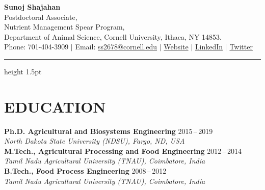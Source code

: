 \documentclass[11pt]{article}
\begin{document}
\begin{center}
\textbf{\LARGE{Sunoj Shajahan}}\\
{Postdoctoral Associate}, \\ 
Nutrient Management Spear Program, \\
Department of Animal Science, Cornell University, Ithaca, NY 14853. \\
Phone: 701-404-3909 $\vert$ Email: \url{ss2678@cornell.edu} $\vert$ \href{http://nmsp.cals.cornell.edu/about/bios/Sunoj.html}{Website} $\vert$ \href{https://www.linkedin.com/in/sunoj-shajahan-ph-d-23606190/}{LinkedIn} $\vert$ \href{https://twitter.com/home}{Twitter}
\vspace{4pt}
\hrule height 1.5pt
\end{center}


\section*{EDUCATION}
      \textbf{Ph.D. Agricultural and Biosystems Engineering} \hfill 2015\,--\,2019\\
\textit{North Dakota State University (NDSU), Fargo, ND, USA}\\
\vspace{0.5em}
      \textbf{M.Tech., Agricultural Processing and Food Engineering} \hfill 2012\,--\,2014\\
      \textit{Tamil Nadu Agricultural University (TNAU), Coimbatore, India}\\
\vspace{0.5em}
      \textbf{B.Tech., Food Process Engineering} \hfill 2008\,--\,2012\\
      \textit{Tamil Nadu Agricultural University (TNAU), Coimbatore, India}\\
\end{document}
